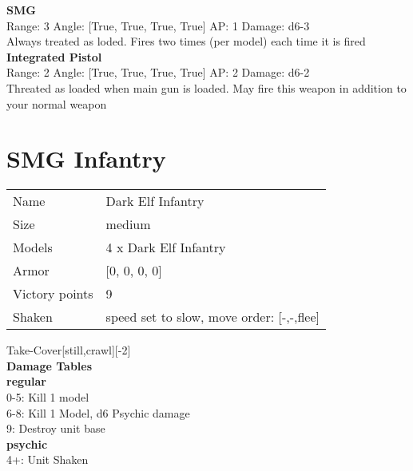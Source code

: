 {\bf SMG } \\



Range: 3  Angle: [True, True, True, True] AP: 1 Damage: d6-3 \\
Always treated as loded. Fires two times (per model) each time it is fired\\ 




{\bf Integrated Pistol } \\



Range: 2  Angle: [True, True, True, True] AP: 2 Damage: d6-2 \\
Threated as loaded when main gun is loaded. May fire this weapon in addition to your normal weapon\\ 




 















\clearpage

\section{ SMG Infantry }

\begin{tabular}{ll}
  Name & Dark Elf Infantry \\
  Size & medium\\
  Models & 4 x Dark Elf Infantry\\
  Armor & [0, 0, 0, 0]\\
  Victory points & 9\\
  Shaken & speed set to slow, move order: [-,-,flee]\\
\end{tabular}

Take-Cover[still,crawl][-2]\\ 



{\bf Damage Tables} \\
 {\bf regular } \\
0-5: Kill 1 model \\
6-8: Kill 1 Model, d6 Psychic damage \\
9: Destroy unit base \\
 {\bf psychic } \\
4+: Unit Shaken \\


